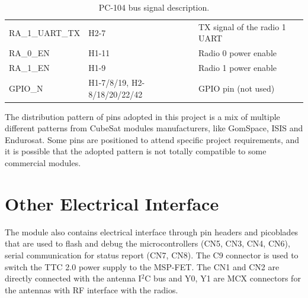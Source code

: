 \begin{table}[!h]
\begin{tabular}{lL{0.3\textwidth}l}
        RA\_1\_UART\_TX  & H2-7                             & TX signal of the radio 1 UART         \\
        RA\_0\_EN        & H1-11                            & Radio 0 power enable                  \\
        RA\_1\_EN        & H1-9                             & Radio 1 power enable                  \\
        GPIO\_N          & H1-7/8/19, H2-8/18/20/22/42      & GPIO pin (not used)                   \\
        \bottomrule[1.5pt]
    \end{tabular}
    \caption{PC-104 bus signal description.}
    \label{tab:pc104-signals}
\end{table}

The distribution pattern of pins adopted in this project is a mix of multiple different patterns from CubeSat modules manufacturers, like GomSpace, ISIS and Endurosat. Some pins are positioned to attend specific project requirements, and it is possible that the adopted pattern is not totally compatible to some commercial modules.

\section{Other Electrical Interface}

The module also contains electrical interface through pin headers and picoblades that are used to flash and debug the microcontrollers (CN5, CN3, CN4, CN6), serial communication for status report (CN7, CN8). The C9 connector is used to switch the TTC 2.0 power supply to the MSP-FET. The CN1 and CN2 are directly connected with the antenna I$^{2}$C bus and Y0, Y1 are MCX connectors for the antennas with RF interface with the radios.

